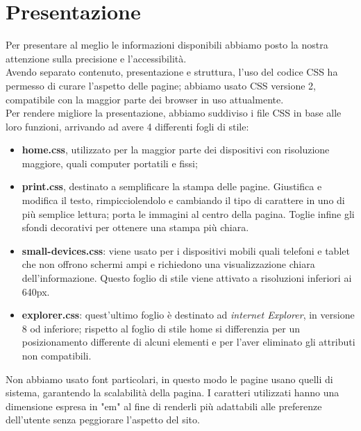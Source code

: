 \section{Presentazione}{
	Per presentare al meglio le informazioni disponibili abbiamo posto la nostra attenzione sulla precisione e l'accessibilità.\\
	Avendo separato contenuto, presentazione e struttura, l'uso del codice CSS ha permesso di curare l'aspetto delle pagine; abbiamo usato CSS versione 2, compatibile con la maggior parte dei browser in uso attualmente.\\
	Per rendere migliore la presentazione, abbiamo suddiviso i file CSS in base alle loro funzioni, arrivando ad avere 4 differenti fogli di stile:
	\begin{itemize}
		\item \textbf{home.css}, utilizzato per la maggior parte dei dispositivi con risoluzione maggiore, quali computer portatili e fissi;
		\item \textbf{print.css}, destinato a semplificare la stampa delle pagine.
		Giustifica e modifica il testo, rimpicciolendolo e cambiando il tipo di carattere in uno di più semplice lettura; porta le immagini al centro della pagina. Toglie infine gli sfondi decorativi per ottenere una stampa più chiara.
		
		\item \textbf{small-devices.css}: viene usato per i dispositivi mobili quali telefoni e tablet che non offrono schermi ampi e richiedono 
		una visualizzazione chiara dell'informazione. Questo foglio di stile viene attivato a risoluzioni inferiori ai 640px.
		\item \textbf{explorer.css}: quest'ultimo foglio è destinato ad \textit{internet Explorer}, in versione 8 od inferiore; rispetto al foglio di stile home si differenzia per un posizionamento differente di alcuni elementi e per l'aver eliminato gli attributi non compatibili.
	\end{itemize}
	Non abbiamo usato font particolari, in questo modo le pagine usano quelli di sistema, garantendo la scalabilità della pagina. I caratteri utilizzati hanno una dimensione espresa in "em" al fine di renderli più adattabili alle preferenze dell'utente senza peggiorare l'aspetto del sito.
}